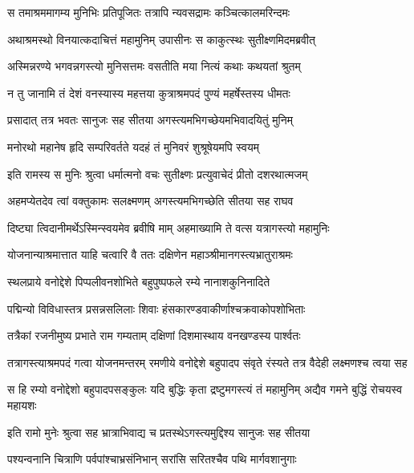 \twolineshloka
{स तमाश्रममागम्य मुनिभिः प्रतिपूजितः}
{तत्रापि न्यवसद्रामः कञ्चित्कालमरिन्दमः} %

\twolineshloka
{अथाश्रमस्थो विनयात्कदाचित्तं महामुनिम्}
{उपासीनः स काकुत्स्थः सुतीक्ष्णमिदमब्रवीत्} %

\twolineshloka
{अस्मिन्नरण्ये भगवन्नगस्त्यो मुनिसत्तमः}
{वसतीति मया नित्यं कथाः कथयतां श्रुतम्} %

\twolineshloka
{न तु जानामि तं देशं वनस्यास्य महत्तया}
{कुत्राश्रमपदं पुण्यं महर्षेस्तस्य धीमतः} %

\twolineshloka
{प्रसादात् तत्र भवतः सानुजः सह सीतया}
{अगस्त्यमभिगच्छेयमभिवादयितुं मुनिम्} %

\twolineshloka
{मनोरथो महानेष हृदि सम्परिवर्तते}
{यदहं तं मुनिवरं शुश्रूषेयमपि स्वयम्} %

\twolineshloka
{इति रामस्य स मुनिः श्रुत्वा धर्मात्मनो वचः}
{सुतीक्ष्णः प्रत्युवाचेदं प्रीतो दशरथात्मजम्} %

\twolineshloka
{अहमप्येतदेव त्वां वक्तुकामः सलक्ष्मणम्}
{अगस्त्यमभिगच्छेति सीतया सह राघव} %

\twolineshloka
{दिष्ट्या त्विदानीमर्थेऽस्मिन्स्वयमेव ब्रवीषि माम्}
{अहमाख्यामि ते वत्स यत्रागस्त्यो महामुनिः} %

\twolineshloka
{योजनान्याश्रमात्तात याहि चत्वारि वै ततः}
{दक्षिणेन महाञ्श्रीमानगस्त्यभ्रातुराश्रमः} %

\twolineshloka
{स्थलप्राये वनोद्देशे पिप्पलीवनशोभिते}
{बहुपुष्पफले रम्ये नानाशकुनिनादिते} %

\twolineshloka
{पद्मिन्यो विविधास्तत्र प्रसन्नसलिलाः शिवाः}
{हंसकारण्डवाकीर्णाश्चक्रवाकोपशोभिताः} %

\twolineshloka
{तत्रैकां रजनीमुष्य प्रभाते राम गम्यताम्}
{दक्षिणां दिशमास्थाय वनखण्डस्य पार्श्वतः} %

\threelineshloka
{तत्रागस्त्याश्रमपदं गत्वा योजनमन्तरम्}
{रमणीये वनोद्देशे बहुपादप संवृते}
{रंस्यते तत्र वैदेही लक्ष्मणश्च त्वया सह} %

\threelineshloka
{स हि रम्यो वनोद्देशो बहुपादपसङ्कुलः}
{यदि बुद्धिः कृता द्रष्टुमगस्त्यं तं महामुनिम्}
{अद्यैव गमने बुद्धिं रोचयस्व महायशः} %

\twolineshloka
{इति रामो मुनेः श्रुत्वा सह भ्रात्राभिवाद्य च}
{प्रतस्थेऽगस्त्यमुद्दिश्य सानुजः सह सीतया} %

\twolineshloka
{पश्यन्वनानि चित्राणि पर्वपांश्चाभ्रसंनिभान्}
{सरांसि सरितश्चैव पथि मार्गवशानुगाः} %

